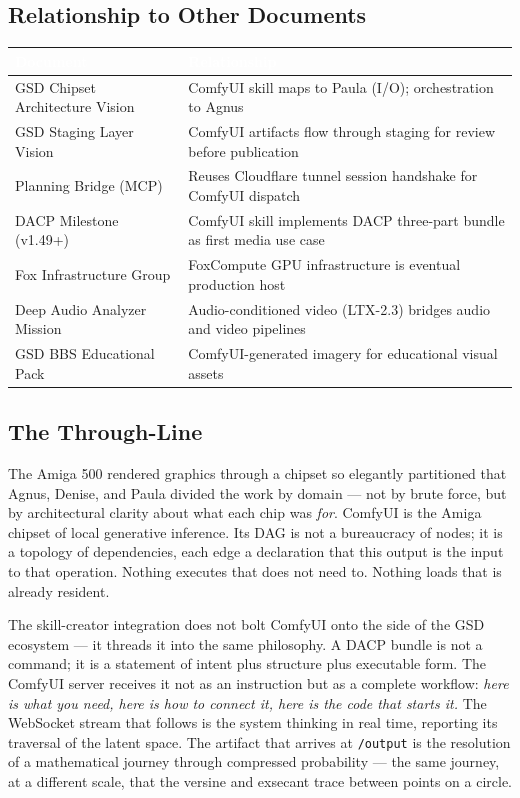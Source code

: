 \documentclass[11pt,letterpaper]{article}
\newcommand{\tableheader}[1]{\textbf{\sffamily\textcolor{white}{#1}}}
\begin{document}
\subsection{Relationship to Other Documents}

\begin{center}
\begin{tabularx}{\textwidth}{L{4.5cm}X}
\toprule
{}
\tableheader{Document} & \tableheader{Relationship} \\
\midrule
GSD Chipset Architecture Vision & ComfyUI skill maps to Paula (I/O); orchestration to Agnus \\
GSD Staging Layer Vision & ComfyUI artifacts flow through staging for review before publication \\
Planning Bridge (MCP) & Reuses Cloudflare tunnel session handshake for ComfyUI dispatch \\
DACP Milestone (v1.49+) & ComfyUI skill implements DACP three-part bundle as first media use case \\
Fox Infrastructure Group & FoxCompute GPU infrastructure is eventual production host \\
Deep Audio Analyzer Mission & Audio-conditioned video (LTX-2.3) bridges audio and video pipelines \\
GSD BBS Educational Pack & ComfyUI-generated imagery for educational visual assets \\
\bottomrule
\end{tabularx}
\end{center}

\subsection{The Through-Line}

The Amiga 500 rendered graphics through a chipset so elegantly partitioned that Agnus,
Denise, and Paula divided the work by domain --- not by brute force, but by architectural
clarity about what each chip was \emph{for}. ComfyUI is the Amiga chipset of local
generative inference. Its DAG is not a bureaucracy of nodes; it is a topology of
dependencies, each edge a declaration that this output is the input to that operation.
Nothing executes that does not need to. Nothing loads that is already resident.

The skill-creator integration does not bolt ComfyUI onto the side of the GSD ecosystem
--- it threads it into the same philosophy. A DACP bundle is not a command; it is a
statement of intent plus structure plus executable form. The ComfyUI server receives
it not as an instruction but as a complete workflow: \emph{here is what you need, here
is how to connect it, here is the code that starts it.} The WebSocket stream that follows
is the system thinking in real time, reporting its traversal of the latent space. The
artifact that arrives at \texttt{/output} is the resolution of a mathematical journey
through compressed probability --- the same journey, at a different scale, that the
versine and exsecant trace between points on a circle.
\end{document}
